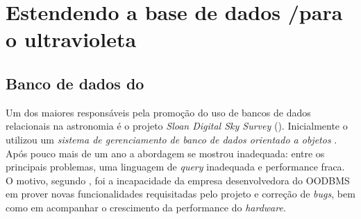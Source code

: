 


\chapter{Estendendo a base de dados \SDSS/\STARLIGHT para o ultravioleta}
\label{sec:Crossmatch}



\section{Banco de dados do \SDSS}

Um dos maiores responsáveis pela promoção do uso de bancos de dados relacionais
na astronomia é o projeto {\em Sloan Digital Sky Survey} (\SDSS). Inicialmente o
\SDSS utilizou um {\em sistema de gerenciamento de banco de dados orientado a
objetos} \citep[{\em Object Oriented Database Management System},
OODBMS;][]{Maier1986}. Após pouco mais de um ano a abordagem se mostrou
inadequada: entre os principais problemas, uma linguagem de {\em query}
inadequada e performance fraca. O motivo, segundo \citet{Thakar2004}, foi a
incapacidade da empresa desenvolvedora do OODBMS em prover novas funcionalidades
requisitadas pelo projeto e correção de {\em bugs}, bem como em acompanhar o
crescimento da performance do {\em hardware}.


